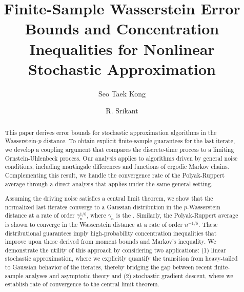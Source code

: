 \documentclass[11pt]{article}
\title{Finite-Sample Wasserstein Error Bounds and Concentration Inequalities for Nonlinear Stochastic Approximation
}
\author{Seo Taek Kong \and R. Srikant}
\date{}
\begin{document}
\maketitle
\let\thefootnote\relax{}


\begin{abstract}
This paper derives \nonasymptotic error bounds for \nonlinear stochastic approximation algorithms in the Wasserstein-$p$ distance. To obtain explicit finite-sample guarantees for the last iterate, we develop a coupling argument that compares the discrete-time process to a limiting Ornstein-Uhlenbeck process. Our analysis applies to algorithms driven by general noise conditions, including martingale differences and functions of ergodic Markov chains. Complementing this result, we handle the convergence rate of the Polyak-Ruppert average through a direct analysis that applies under the same general setting.

Assuming the driving noise satisfies a \nonasymptotic central limit theorem, we show that the normalized last iterates converge to a Gaussian distribution in the $p$-Wasserstein distance at a rate of order $\gamma_n^{1/6}$, where $\gamma_n$ is the \stepsize. Similarly, the Polyak-Ruppert average is shown to converge in the Wasserstein distance at a rate of order $n^{-1/6}$. These distributional guarantees imply high-probability concentration inequalities that improve upon those derived from moment bounds and Markov's inequality. We demonstrate the utility of this approach by considering two applications: (1) linear stochastic approximation, where we explicitly quantify the transition from heavy-tailed to Gaussian behavior of the iterates, thereby bridging the gap between recent finite-sample analyses and asymptotic theory and (2) stochastic gradient descent, where we establish rate of convergence to the central limit theorem. 
    
\end{abstract}



\tableofcontents
\end{document}
